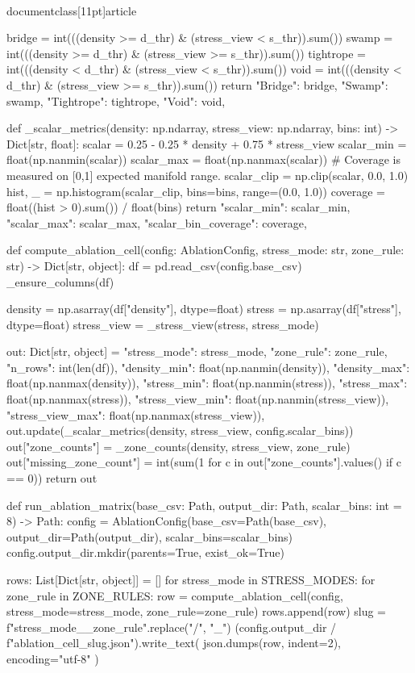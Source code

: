 \\documentclass[11pt]{article}
\begin{document}
\begin{CodeBlock}
    bridge = int(((density >= d_thr) & (stress_view < s_thr)).sum())
    swamp = int(((density >= d_thr) & (stress_view >= s_thr)).sum())
    tightrope = int(((density < d_thr) & (stress_view < s_thr)).sum())
    void = int(((density < d_thr) & (stress_view >= s_thr)).sum())
    return {
        "Bridge": bridge,
        "Swamp": swamp,
        "Tightrope": tightrope,
        "Void": void,
    }


def _scalar_metrics(density: np.ndarray, stress_view: np.ndarray, bins: int) -> Dict[str, float]:
    scalar = 0.25 - 0.25 * density + 0.75 * stress_view
    scalar_min = float(np.nanmin(scalar))
    scalar_max = float(np.nanmax(scalar))
    # Coverage is measured on [0,1] expected manifold range.
    scalar_clip = np.clip(scalar, 0.0, 1.0)
    hist, _ = np.histogram(scalar_clip, bins=bins, range=(0.0, 1.0))
    coverage = float((hist > 0).sum()) / float(bins)
    return {
        "scalar_min": scalar_min,
        "scalar_max": scalar_max,
        "scalar_bin_coverage": coverage,
    }


def compute_ablation_cell(config: AblationConfig, stress_mode: str, zone_rule: str) -> Dict[str, object]:
    df = pd.read_csv(config.base_csv)
    _ensure_columns(df)

    density = np.asarray(df["density"], dtype=float)
    stress = np.asarray(df["stress"], dtype=float)
    stress_view = _stress_view(stress, stress_mode)

    out: Dict[str, object] = {
        "stress_mode": stress_mode,
        "zone_rule": zone_rule,
        "n_rows": int(len(df)),
        "density_min": float(np.nanmin(density)),
        "density_max": float(np.nanmax(density)),
        "stress_min": float(np.nanmin(stress)),
        "stress_max": float(np.nanmax(stress)),
        "stress_view_min": float(np.nanmin(stress_view)),
        "stress_view_max": float(np.nanmax(stress_view)),
    }
    out.update(_scalar_metrics(density, stress_view, config.scalar_bins))
    out["zone_counts"] = _zone_counts(density, stress_view, zone_rule)
    out["missing_zone_count"] = int(sum(1 for c in out["zone_counts"].values() if c == 0))
    return out


def run_ablation_matrix(base_csv: Path, output_dir: Path, scalar_bins: int = 8) -> Path:
    config = AblationConfig(base_csv=Path(base_csv), output_dir=Path(output_dir), scalar_bins=scalar_bins)
    config.output_dir.mkdir(parents=True, exist_ok=True)

    rows: List[Dict[str, object]] = []
    for stress_mode in STRESS_MODES:
        for zone_rule in ZONE_RULES:
            row = compute_ablation_cell(config, stress_mode=stress_mode, zone_rule=zone_rule)
            rows.append(row)
            slug = f"{stress_mode}__{zone_rule}".replace("/", "_")
            (config.output_dir / f"ablation_cell_{slug}.json").write_text(
                json.dumps(row, indent=2), encoding="utf-8"
            )


\end{CodeBlock}
\end{document}
